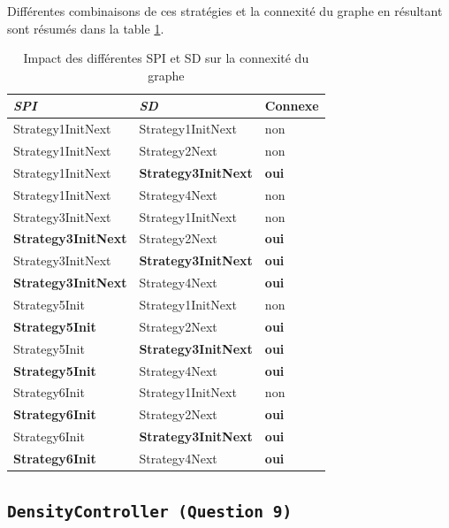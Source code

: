 \documentclass[a4paper]{article}
\begin{document}
Différentes combinaisons de ces stratégies et la connexité du graphe
en résultant sont résumés dans la table \ref{table:SPISDGraphe}.

  \begin{table}[H]
\centering
    \begin{tabular}{| l | l | l |}
  \hline
  \textsl{SPI} & \textsl{SD} & \textbf{Connexe}\\
  \hline
  Strategy1InitNext & Strategy1InitNext & non\\
  \hline
  Strategy1InitNext & Strategy2Next &  non\\
  \hline
  Strategy1InitNext & \textbf{Strategy3InitNext} & \textbf{oui}\\
  \hline
  Strategy1InitNext & Strategy4Next & non \\
  \hline
  Strategy3InitNext & Strategy1InitNext & non \\
  \hline
  \textbf{Strategy3InitNext} & Strategy2Next & \textbf{oui} \\
  \hline
  Strategy3InitNext & \textbf{Strategy3InitNext} & \textbf{oui}\\
  \hline
  \textbf{Strategy3InitNext} & Strategy4Next & \textbf{oui}\\
  \hline
  Strategy5Init & Strategy1InitNext & non \\
  \hline
  \textbf{Strategy5Init} & Strategy2Next & \textbf{oui}\\
  \hline
  Strategy5Init & \textbf{Strategy3InitNext} & \textbf{oui} \\
  \hline
  \textbf{Strategy5Init} & Strategy4Next & \textbf{oui} \\
  \hline
  Strategy6Init & Strategy1InitNext & non\\
  \hline
  \textbf{Strategy6Init} & Strategy2Next & \textbf{oui} \\
  \hline
  Strategy6Init & \textbf{Strategy3InitNext} & \textbf{oui}\\
  \hline
  \textbf{Strategy6Init} & Strategy4Next & \textbf{oui}\\
  \hline
\end{tabular}
    \caption{Impact des différentes SPI et SD sur la connexité du graphe}
    \label{table:SPISDGraphe}
  \end{table}

  \subsection{\texttt{DensityController (Question 9)}}
\end{document}
